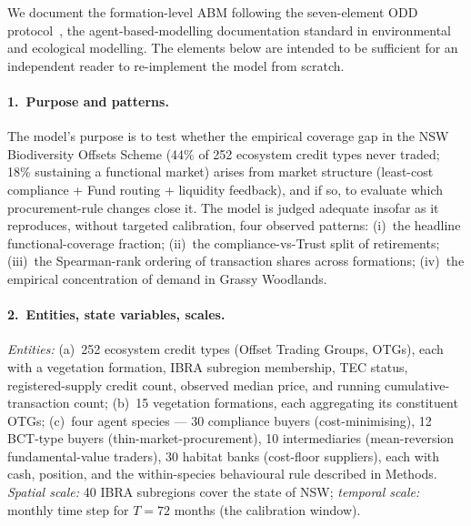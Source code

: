 \documentclass[pdflatex,sn-nature,oneside]{sn-jnl}
\begin{document}
We document the formation-level ABM following the seven-element ODD
protocol~\cite{GrimmEtAl2020}, the agent-based-modelling
documentation standard in environmental and ecological modelling. The
elements below are intended to be sufficient for an independent reader
to re-implement the model from scratch.

\paragraph{1.~Purpose and patterns.}
The model's purpose is to test whether the empirical coverage gap in the
NSW Biodiversity Offsets Scheme (44\% of 252 ecosystem credit types
never traded; 18\% sustaining a functional market) arises from market
structure (least-cost compliance + Fund routing + liquidity feedback),
and if so, to evaluate which procurement-rule changes close it. The
model is judged adequate insofar as it reproduces, without targeted
calibration, four observed patterns: (i)~the headline functional-coverage
fraction; (ii)~the compliance-vs-Trust split of retirements; (iii)~the
Spearman-rank ordering of transaction shares across formations;
(iv)~the empirical concentration of demand in Grassy Woodlands.

\paragraph{2.~Entities, state variables, scales.}
\textit{Entities:} (a)~252 ecosystem credit types (Offset Trading Groups,
OTGs), each with a vegetation formation, IBRA subregion membership, TEC
status, registered-supply credit count, observed median price, and
running cumulative-transaction count; (b)~15 vegetation formations,
each aggregating its constituent OTGs; (c)~four agent species --- 30
compliance buyers (cost-minimising), 12 BCT-type buyers
(thin-market-procurement), 10 intermediaries (mean-reversion
fundamental-value traders), 30 habitat banks (cost-floor suppliers),
each with cash, position, and the within-species behavioural rule
described in Methods. \textit{Spatial scale:} 40 IBRA subregions cover
the state of NSW; \textit{temporal scale:} monthly time step for
$T = 72$ months (the calibration window).
\end{document}
